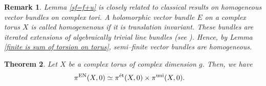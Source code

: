 \documentclass[12pt, reqno]{amsart}
\theoremstyle{plain}
\newtheorem{theorem}{Theorem}[section]
\newtheorem{remark}[theorem]{Remark}
\numberwithin{equation}{section}
\begin{document}
\begin{remark}
\rm	Lemma \ref{sf=f+u} is closely related to classical results on homogeneous vector bundles on complex tori. A holomorphic vector bundle $E$ on a complex torus $X$ is called \emph{homogenenous} if it is translation invariant. These bundles are iterated extensions of algebraically trivial line bundles (see \cite{Mat59, Mor59}). Hence, by Lemma \ref{finite is sum of torsion on torus}, semi--finite vector bundles are homogeneous.
\end{remark}

\begin{theorem}\label{Prod EN=N*uni on torus}
Let $X$ be a complex torus of complex dimension $g$. Then, we have 
\begin{align*}
	\pi^{\rm EN}(X,0) & \simeq \pi^{\mathrm{\acute{e}t}}(X,0) \times \pi^{\rm uni}(X,0).
\end{align*}
\end{theorem}
\end{document}
